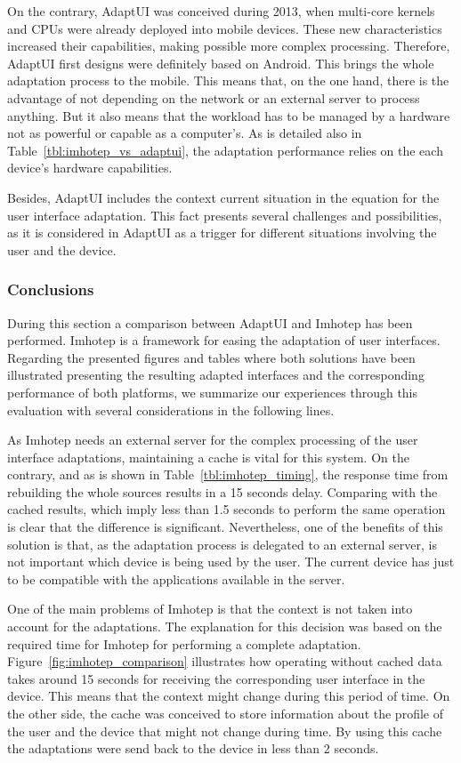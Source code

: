 On the contrary, AdaptUI was conceived during 2013, when multi-core kernels and
CPUs were already deployed into mobile devices. These new characteristics 
increased their capabilities, making possible more complex processing. 
Therefore, AdaptUI first designs were definitely based on Android. This brings 
the whole adaptation process to the mobile. This means that, on the one hand, 
there is the advantage of not depending on the network or an external server to 
process anything. But it also means that the workload has to be managed by a 
hardware not as powerful or capable as a computer's. As is detailed also in 
Table~\ref{tbl:imhotep_vs_adaptui}, the adaptation performance relies on the
each device's hardware capabilities. 

Besides, AdaptUI includes the context current situation in the equation for the 
user interface adaptation. This fact presents several challenges and 
possibilities, as it is considered in AdaptUI as a trigger for different 
situations involving the user and the device.


\subsubsection{Conclusions}
\label{sec:imhotep_conclusions}

During this section a comparison between AdaptUI and Imhotep has been performed.
Imhotep is a framework for easing the adaptation of user interfaces. Regarding 
the presented figures and tables where both solutions have been illustrated 
presenting the resulting adapted interfaces and the corresponding performance 
of both platforms, we summarize our experiences through this evaluation with 
several considerations in the following lines.

As Imhotep needs an external server for the complex processing of the user 
interface adaptations, maintaining a cache is vital for this system. On the 
contrary, and as is shown in Table~\ref{tbl:imhotep_timing}, the response time 
from rebuilding the whole sources results in a 15 seconds delay. Comparing with
the cached results, which imply less than 1.5 seconds to perform the same 
operation is clear that the difference is significant. Nevertheless, one of the 
benefits of this solution is that, as the adaptation process is delegated to an 
external server, is not important which device is being used by the user. The
current device has just to be compatible with the applications available in the
server.

One of the main problems of Imhotep is that the context is not taken into 
account for the adaptations. The explanation for this decision was based on the 
required time for Imhotep for performing a complete adaptation. 
Figure~\ref{fig:imhotep_comparison} illustrates how operating without cached 
data takes around 15 seconds for receiving the corresponding user interface in 
the device. This means that the context might change during this period of time. 
On the other side, the cache was conceived to store information about the 
profile of the user and the device that might not change during time. By using 
this cache the adaptations were send back to the device in less than 2 seconds.

